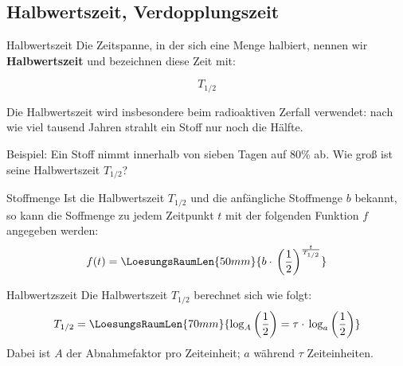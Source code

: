 \newpage

\subsection{Halbwertszeit, Verdopplungszeit}

\begin{definition}{Halbwertszeit}{}
Die Zeitspanne, in der sich eine Menge halbiert, nennen wir
\textbf{Halbwertszeit} und bezeichnen diese Zeit mit:

$$T_{1/2}$$
\end{definition}

Die Halbwertszeit wird insbesondere
  beim radioaktiven Zerfall verwendet: nach wie viel tausend Jahren strahlt
  ein Stoff nur noch die Hälfte.


Beispiel: Ein Stoff nimmt innerhalb von sieben Tagen auf 80\% ab. Wie
groß ist seine Halbwertszeit $T_{1/2}$?

\newpage

\begin{gesetz}{Stoffmenge}{}
  Ist die Halbwertszeit $T_{1/2}$ und die anfängliche Stoffmenge $b$
  bekannt, so kann die Soffmenge zu jedem Zeitpunkt $t$ mit der
  folgenden Funktion $f$ angegeben werden:
  $$f(t) = \LoesungsRaumLen{50mm}{b\cdot{}\left(\frac12\right)^\frac{t}{T_{1/2}}}$$
\end{gesetz}
  
\begin{gesetz}{Halbwertzszeit}{}
  Die Halbwertszeit $T_{1/2}$ berechnet sich wie folgt:
  $$T_{1/2} = \LoesungsRaumLen{70mm}{\log_A\left(\frac12\right) = \tau
  \cdot{} \log_a\left(\frac12\right)}$$
  Dabei ist $A$ der Abnahmefaktor pro Zeiteinheit; $a$ während $\tau$ Zeiteinheiten.
\end{gesetz}


